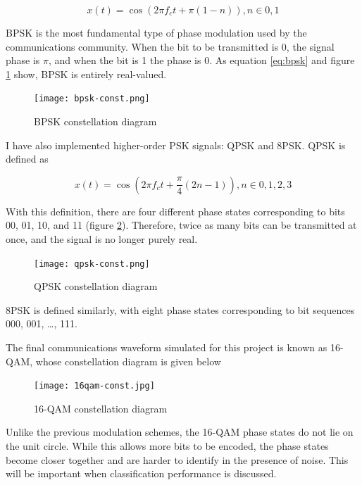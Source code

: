 \documentclass{article}
\begin{document}
\begin{equation}
    x(t) = \cos(2\pi f_ct + \pi (1-n)), n \in {0,1}
    \label{eq:bpsk}
\end{equation}

BPSK is the most fundamental type of phase modulation used by the communications community. When
the bit to be transmitted is 0, the signal phase is $\pi$, and when the bit is 1
the phase is 0. As equation \ref{eq:bpsk} and figure \ref{fig:bpsk} show,
BPSK is entirely real-valued.

\begin{figure}[H]
    \centering
    \texttt{[image: bpsk-const.png]}
    \caption{BPSK constellation diagram}
    \label{fig:bpsk}
\end{figure}

I have also implemented higher-order PSK signals: QPSK and 8PSK. QPSK is defined
as

\begin{equation}
    x(t) = \cos(2\pi f_ct + \frac{\pi}{4} (2n-1)), n \in {0,1,2,3}
\end{equation}
 
With this definition, there are four different phase states corresponding to
bits 00, 01, 10, and 11 (figure \ref{fig:qpsk}). Therefore, twice as many bits can be transmitted at
once, and the signal is no longer purely real.

\begin{figure}[H]
    \centering
    \texttt{[image: qpsk-const.png]}
    \caption{QPSK constellation diagram}
    \label{fig:qpsk}
\end{figure}

8PSK is defined similarly, with eight phase states corresponding to bit
sequences 000, 001, \dots, 111. 

The final communications waveform simulated for this project is known as 16-QAM,
whose constellation diagram is given below

\begin{figure}[H]
    \centering
    \texttt{[image: 16qam-const.jpg]}
    \caption{16-QAM constellation diagram}
    \label{fig:16qam}
\end{figure}

Unlike the previous modulation schemes, the 16-QAM phase states do not lie on
the unit circle. While this allows more bits to be encoded, the phase states
become closer together and are harder to identify in the presence of noise. This
will be important when classification performance is discussed.
\end{document}
